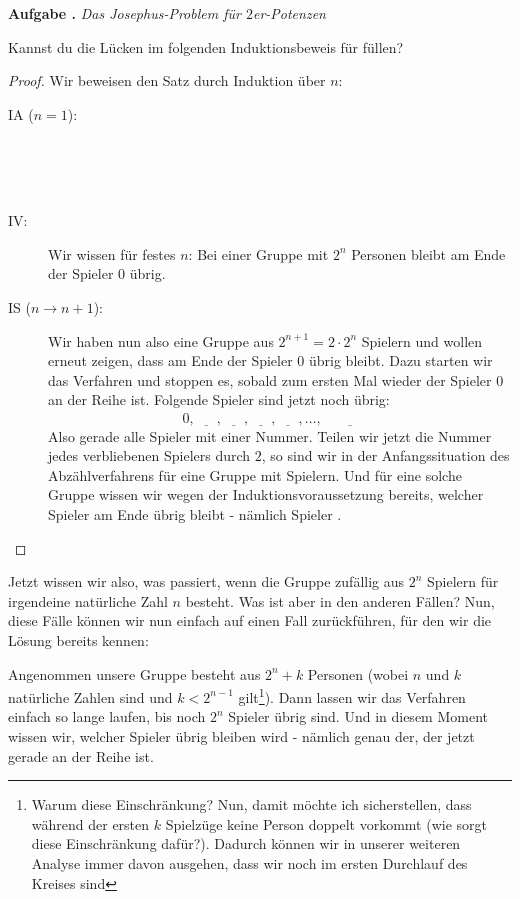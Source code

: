 \documentclass[a4paper,ngerman,12pt]{scrartcl}
\theoremstyle{definition}
\theoremstyle{plain}
\theoremstyle{remark}
\newlength{\aufgabenskip}
\newcounter{aufgabennummer}
\newenvironment{aufgabe}[1]{
	\refstepcounter{aufgabennummer}
	\textbf{Aufgabe \theaufgabennummer.} \emph{#1} \par
}{\vspace{\aufgabenskip}}
\begin{document}
\begin{aufgabe}{Das Josephus-Problem für $2$er-Potenzen}
	Kannst du die Lücken im folgenden Induktionsbeweis für  füllen?
	
	\begin{proof}
		Wir beweisen den Satz durch Induktion über $n$:
		\begin{description}
			\item[IA ($n=1$):] \textcolor{white}{Bei einer Gruppengröße von $2^1=2$ Personen ist lediglich ein einziger Spielzug notwendig: Spieler $0$ beginnt, indem er Spieler $1$ antippt. Dieser scheidet aus, wodurch Spieler $0$ als letzter Spieler übrig bleibt.}
			\item[IV:] Wir wissen für festes $n$: Bei einer Gruppe mit $2^n$ Personen bleibt am Ende der Spieler $0$ übrig.
			\item[IS ($n\to n+1$):] Wir haben nun also eine Gruppe aus $2^{n+1} = 2\cdot 2^n$ Spielern und wollen erneut zeigen, dass am Ende der Spieler $0$ übrig bleibt. Dazu starten wir das Verfahren und stoppen es, sobald zum ersten Mal wieder der Spieler $0$ an der Reihe ist. Folgende Spieler sind jetzt noch übrig:
			\[0, \underline{\phantom{2\quad}}, \underline{\phantom{4\quad}}, \underline{\phantom{6\quad}}, \underline{\phantom{8\quad}}, \dots , \underline{\phantom{ 2^{n+1}-2 }}\]
			Also gerade alle Spieler mit einer \underline{\phantom{ geraden\quad }} Nummer. Teilen wir jetzt die Nummer jedes verbliebenen Spielers durch $2$, so sind wir in der Anfangssituation des Abzählverfahrens für eine Gruppe mit \underline{\phantom{$2^n$\quad}} Spielern. Und für eine solche Gruppe wissen wir wegen der Induktionsvoraussetzung bereits, welcher Spieler am Ende übrig bleibt - nämlich Spieler \underline{\phantom{$0$\quad}}. \qedhere
		\end{description}
	\end{proof}
\end{aufgabe}

Jetzt wissen wir also, was passiert, wenn die Gruppe zufällig aus $2^n$ Spielern für irgendeine natürliche Zahl $n$ besteht. Was ist aber in den anderen Fällen? Nun, diese Fälle können wir nun einfach auf einen Fall zurückführen, für den wir die Lösung bereits kennen:

Angenommen unsere Gruppe besteht aus $2^n + k$ Personen (wobei $n$ und $k$ natürliche Zahlen sind und $k < 2^{n-1}$ gilt\footnote{Warum diese Einschränkung? Nun, damit möchte ich sicherstellen, dass während der ersten $k$ Spielzüge keine Person doppelt vorkommt (wie sorgt diese Einschränkung dafür?). Dadurch können wir in unserer weiteren Analyse immer davon ausgehen, dass wir noch im ersten Durchlauf des Kreises sind}). Dann lassen wir das Verfahren einfach so lange laufen, bis noch $2^n$ Spieler übrig sind. Und in diesem Moment wissen wir, welcher Spieler übrig bleiben wird - nämlich genau der, der jetzt gerade an der Reihe ist.
\end{document}
